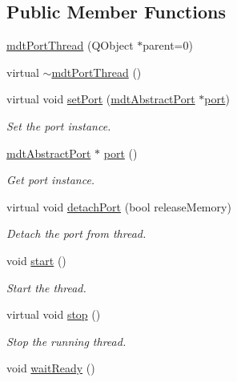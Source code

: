 \subsection*{Public Member Functions}
\begin{DoxyCompactItemize}
\item 
\hyperlink{classmdt_port_thread_aa20869c68d7a016f9e547464f0d8b71e}{mdt\-Port\-Thread} (Q\-Object $\ast$parent=0)
\item 
virtual \hyperlink{classmdt_port_thread_a554615870b4c3b18af73d2ab7262800d}{$\sim$mdt\-Port\-Thread} ()
\item 
virtual void \hyperlink{classmdt_port_thread_acd51474c3a2683676423317bc9cb31b2}{set\-Port} (\hyperlink{classmdt_abstract_port}{mdt\-Abstract\-Port} $\ast$\hyperlink{classmdt_port_thread_a97bff8cf6aca37d8858cc4e5c9294cae}{port})
\begin{DoxyCompactList}\small\item\em Set the port instance. \end{DoxyCompactList}\item 
\hyperlink{classmdt_abstract_port}{mdt\-Abstract\-Port} $\ast$ \hyperlink{classmdt_port_thread_a97bff8cf6aca37d8858cc4e5c9294cae}{port} ()
\begin{DoxyCompactList}\small\item\em Get port instance. \end{DoxyCompactList}\item 
virtual void \hyperlink{classmdt_port_thread_a29b434534a5564efbd9dfe570a61b143}{detach\-Port} (bool release\-Memory)
\begin{DoxyCompactList}\small\item\em Detach the port from thread. \end{DoxyCompactList}\item 
void \hyperlink{classmdt_port_thread_a5a5c1290eaa43182d69c3f39eadbec00}{start} ()
\begin{DoxyCompactList}\small\item\em Start the thread. \end{DoxyCompactList}\item 
virtual void \hyperlink{classmdt_port_thread_a5746ea96689ed80179751ad1353f0b39}{stop} ()
\begin{DoxyCompactList}\small\item\em Stop the running thread. \end{DoxyCompactList}\item 
void \hyperlink{classmdt_port_thread_aca7473f73c6b68fe8c3e1cfc349240e7}{wait\-Ready} ()

\end{DoxyCompactItemize}
